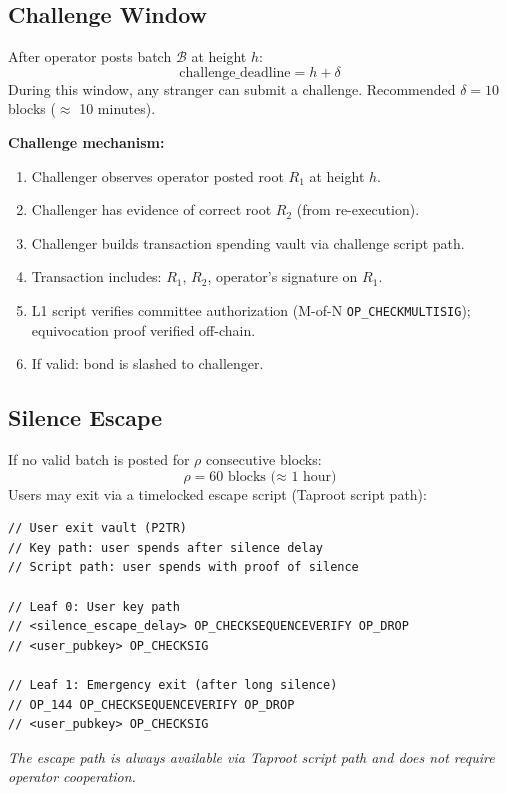 \documentclass[a4paper,11pt]{article}
\begin{document}
\subsection{Challenge Window}
\label{sec:challenge}

After operator posts batch $\mathcal{B}$ at height $h$:
\[
    \text{challenge\_deadline} = h + \delta
\]
During this window, any stranger can submit a challenge. Recommended $\delta = 10$ blocks ($\approx$ 10 minutes).

\textbf{Challenge mechanism:}
\begin{enumerate}[nosep]
    \item Challenger observes operator posted root $R_1$ at height $h$.
    \item Challenger has evidence of correct root $R_2$ (from re-execution).
    \item Challenger builds transaction spending vault via challenge script path.
    \item Transaction includes: $R_1$, $R_2$, operator's signature on $R_1$.
    \item L1 script verifies committee authorization (M-of-N \texttt{OP\_CHECKMULTISIG}); equivocation proof verified off-chain.
    \item If valid: bond is slashed to challenger.
\end{enumerate}

\subsection{Silence Escape}

If no valid batch is posted for $\rho$ consecutive blocks:
\[
    \rho = 60 \text{ blocks (≈ 1 hour)}
\]
Users may exit via a timelocked escape script (Taproot script path):
\begin{lstlisting}[style=script]
// User exit vault (P2TR)
// Key path: user spends after silence delay
// Script path: user spends with proof of silence

// Leaf 0: User key path
// <silence_escape_delay> OP_CHECKSEQUENCEVERIFY OP_DROP
// <user_pubkey> OP_CHECKSIG

// Leaf 1: Emergency exit (after long silence)
// OP_144 OP_CHECKSEQUENCEVERIFY OP_DROP
// <user_pubkey> OP_CHECKSIG
\end{lstlisting}

\noindent\textit{The escape path is always available via Taproot script path and does not require operator cooperation.}
\end{document}
